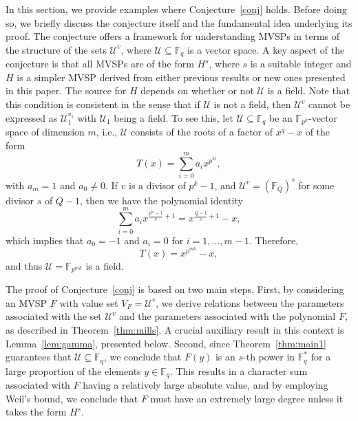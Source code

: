 \documentclass[11pt]{amsart}
\theoremstyle{definition}
\theoremstyle{remark}
\begin{document}
In this section, we provide examples where Conjecture~\ref{conj} holds. Before doing so, we briefly discuss the conjecture itself and the fundamental idea underlying  its proof. The conjecture offers a framework for understanding MVSPs  in terms of the structure of the sets \(\mathcal{U}^v\), where \(\mathcal{U} \subseteq \mathbb{F}_q\) is a vector space. A key aspect of the conjecture is that all MVSPs are of the form \(H^s\), where \(s\) is a suitable integer and \(H\) is a simpler MVSP derived from either previous results or new ones presented in this paper. The source for \(H\) depends on whether or not \(\mathcal{U}\) is a field. Note that  this condition is consistent in the sense that if \(\mathcal{U}\) is not a field, then \(\mathcal{U}^v\) cannot be expressed as \(\mathcal{U}_1^{v_1}\) with \(\mathcal{U}_1\) being a field.
To see this, let \(\mathcal{U} \subseteq \mathbb{F}_q\) be an \(\mathbb{F}_{p^k}\)-vector space of dimension \(m\), i.e., \(\mathcal{U}\) consists of the roots of a factor of \(x^q - x\) of the form
\[
T(x) = \sum_{i=0}^m a_i x^{p^{k i}},
\]
with \(a_m = 1\) and \(a_0 \neq 0\). If \(v\) is a divisor of \(p^k - 1\), and \(\mathcal{U}^v = (\mathbb{F}_{Q})^s\) for some divisor \(s\) of \(Q - 1\), then we have the polynomial identity
\[
\sum_{i=0}^m a_i x^{\frac{p^{k i} - 1}{v} + 1} = x^{\frac{Q-1}{s} + 1} - x,
\]
which implies that \(a_0 = -1\) and \(a_i = 0\) for \(i = 1, \ldots, m-1\). Therefore,
\[
T(x) = x^{p^{m k}} - x,
\]
and thus \(\mathcal{U} = \mathbb{F}_{p^{m k}}\) is a field.

The proof of Conjecture~\ref{conj} is based on  two main steps. First, by considering an MVSP \(F\) with value set \(V_F = \mathcal{U}^v\), we derive relations between the parameters associated with the set \(\mathcal{U}^v\) and the parameters associated with the polynomial \(F\), as described in Theorem~\ref{thm:mills}. A crucial auxiliary result in this context is Lemma~\ref{lem:gamma}, presented below. Second, since Theorem~\ref{thm:main1} guarantees that \(\mathcal{U} \subseteq \mathbb{F}_q\), we conclude that \(F(y)\) is an \(s\)-th power in \(\mathbb{F}_q^*\) for a large proportion of the elements \(y \in \mathbb{F}_q\). This results in a character sum associated with \(F\) having a relatively large absolute value, and by employing Weil's bound, we conclude that \(F\) must have an extremely large degree unless it takes the form \(H^s\).
\end{document}
